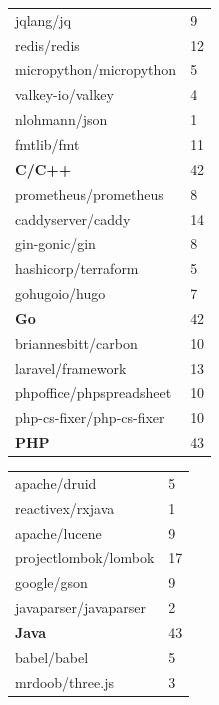 \begin{table}[t]
    \centering
    \begin{minipage}[b]{0.3\textwidth}
        \centering
        \begin{tabular}{ll}
\toprule
\footnotesize jqlang/jq & 9 \\
\footnotesize redis/redis & 12 \\
\scriptsize micropython/micropython & 5 \\
\footnotesize valkey-io/valkey & 4 \\
\footnotesize nlohmann/json & 1 \\
\footnotesize fmtlib/fmt & 11 \\
\midrule
\textbf{C/C++} & 42 \\
\midrule
\scriptsize prometheus/prometheus & 8 \\
\footnotesize caddyserver/caddy & 14 \\
\footnotesize gin-gonic/gin & 8 \\
\footnotesize hashicorp/terraform & 5 \\
\footnotesize gohugoio/hugo & 7 \\
\midrule
\textbf{Go} & 42 \\
\midrule
\footnotesize briannesbitt/carbon & 10 \\
\footnotesize laravel/framework & 13 \\
\scriptsize phpoffice/phpspreadsheet & 10 \\
\scriptsize php-cs-fixer/php-cs-fixer & 10 \\
\midrule
\textbf{PHP} & 43 \\
\bottomrule
        \end{tabular}
    \end{minipage}
    \hfill
    \begin{minipage}[b]{0.3\textwidth}
        \centering
        \begin{tabular}{ll}
\toprule
\footnotesize apache/druid & 5 \\
\footnotesize reactivex/rxjava & 1 \\
\footnotesize apache/lucene & 9 \\
\footnotesize projectlombok/lombok & 17 \\
\footnotesize google/gson & 9 \\
\footnotesize javaparser/javaparser & 2 \\
\midrule
\textbf{Java} & 43 \\
\midrule
\footnotesize babel/babel & 5 \\
\footnotesize mrdoob/three.js & 3 \\

\end{tabular}
\end{minipage}
\end{table}
